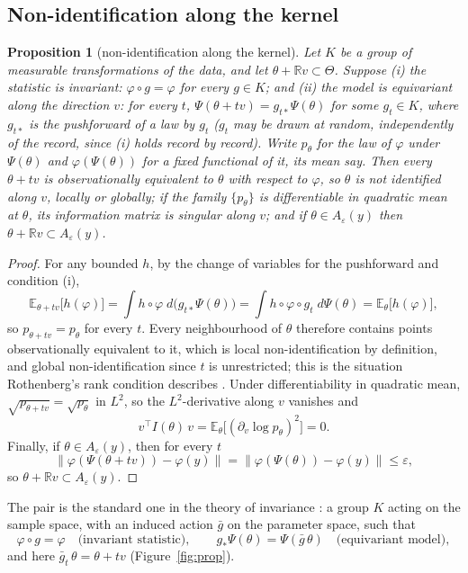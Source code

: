 \documentclass[11pt]{article}
\newtheorem{proposition}{Proposition}
\begin{document}
\subsection{Non-identification along the kernel}
\begin{proposition}[non-identification along the kernel]
Let $K$ be a group of measurable transformations of the data, and let $\theta+\mathbb{R}v\subset\Theta$. Suppose (i) the statistic is \emph{invariant}: $\varphi\circ g=\varphi$ for every $g\in K$; and (ii) the model is \emph{equivariant along the direction $v$}: for every $t$, $\Psi(\theta+tv)=g_{t*}\Psi(\theta)$ for some $g_t\in K$, where $g_{t*}$ is the pushforward of a law by $g_t$ ($g_t$ may be drawn at random, independently of the record, since (i) holds record by record). Write $p_\theta$ for the law of $\varphi$ under $\Psi(\theta)$ and $\varphi(\Psi(\theta))$ for a fixed functional of it, its mean say. Then every $\theta+tv$ is observationally equivalent to $\theta$ with respect to $\varphi$, so $\theta$ is not identified along $v$, locally or globally; if the family $\{p_\theta\}$ is differentiable in quadratic mean at $\theta$, its information matrix is singular along $v$; and if $\theta\in A_\varepsilon(y)$ then $\theta+\mathbb{R}v\subset A_\varepsilon(y)$.
\end{proposition}
\begin{proof}
For any bounded $h$, by the change of variables for the pushforward and condition (i),
\[
\mathbb{E}_{\theta+tv}\bigl[h(\varphi)\bigr]=\int h\circ\varphi\;d\bigl(g_{t*}\Psi(\theta)\bigr)=\int h\circ\varphi\circ g_t\;d\Psi(\theta)=\mathbb{E}_{\theta}\bigl[h(\varphi)\bigr],
\]
so $p_{\theta+tv}=p_\theta$ for every $t$. Every neighbourhood of $\theta$ therefore contains points observationally equivalent to it, which is local non-identification by definition, and global non-identification since $t$ is unrestricted; this is the situation Rothenberg's rank condition describes \parencite{rothenberg1971}. Under differentiability in quadratic mean, $\sqrt{p_{\theta+tv}}=\sqrt{p_\theta}$ in $L^2$, so the $L^2$-derivative along $v$ vanishes and
\[
v^{\top}I(\theta)\,v=\mathbb{E}_\theta\bigl[(\partial_v\log p_\theta)^2\bigr]=0.
\]
Finally, if $\theta\in A_\varepsilon(y)$, then for every $t$
\[
\|\varphi(\Psi(\theta+tv))-\varphi(y)\|=\|\varphi(\Psi(\theta))-\varphi(y)\|\le\varepsilon,
\]
so $\theta+\mathbb{R}v\subset A_\varepsilon(y)$.
\end{proof}
The pair is the standard one in the theory of invariance \parencite[ch.~6]{lehmann2005}: a group $K$ acting on the sample space, with an induced action $\bar g$ on the parameter space, such that
\[
\varphi\circ g=\varphi \quad\text{(invariant statistic)}, \qquad g_{*}\Psi(\theta)=\Psi(\bar g\,\theta) \quad\text{(equivariant model)},
\]
and here $\bar g_t\,\theta=\theta+tv$ (Figure~\ref{fig:prop}).
\end{document}
